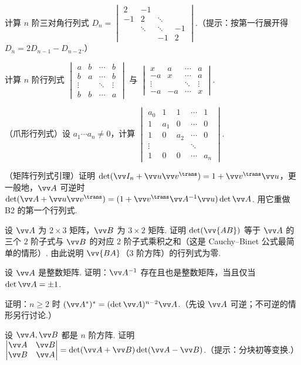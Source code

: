{		\Bgroup
		\begin{exB}
			\item\label{ex:det:B1} 计算 $n$ 阶三对角行列式 $D_n=\begin{vmatrix}2&-1&&\\-1&2&\ddots&\\&\ddots&\ddots&-1\\&&-1&2\end{vmatrix}$.（提示：按第一行展开得 $D_n=2D_{n-1}-D_{n-2}$.）
			\item\label{ex:det:B2} 计算 $n$ 阶行列式 $\begin{vmatrix}a&b&\cdots&b\\b&a&\cdots&b\\ \vdots&&\ddots&\vdots\\b&b&\cdots&a\end{vmatrix}$ 与 $\begin{vmatrix}x&a&\cdots&a\\-a&x&\cdots&a\\ \vdots&&\ddots&\vdots\\-a&-a&\cdots&x\end{vmatrix}$.
			\item\label{ex:det:B3} （爪形行列式）设 $a_1\cdots a_n\ne0$，计算 $\begin{vmatrix}a_0&1&1&\cdots&1\\1&a_1&0&\cdots&0\\1&0&a_2&\cdots&0\\ \vdots&&&\ddots&\\1&0&0&\cdots&a_n\end{vmatrix}$.
			\item\label{ex:det:B4} （矩阵行列式引理）证明 $\det(\vv I_n+\vv u\vv v^\trans)=1+\vv v^\trans\vv u$，更一般地，$\vv A$ 可逆时 $\det(\vv A+\vv u\vv v^\trans)=(1+\vv v^\trans\vv A^{-1}\vv u)\det\vv A$. 用它重做 B2 的第一个行列式.
			\item\label{ex:det:B5} 设 $\vv A$ 为 $2\times3$ 矩阵，$\vv B$ 为 $3\times2$ 矩阵. 证明 $\det(\vv{AB})$ 等于 $\vv A$ 的三个 $2$ 阶子式与 $\vv B$ 的对应 $2$ 阶子式乘积之和（这是 Cauchy–Binet 公式最简单的情形）. 由此说明 $\vv{BA}$（$3$ 阶方阵）的行列式为零.
			\item\label{ex:det:B6} 设 $\vv A$ 是整数矩阵. 证明：$\vv A^{-1}$ 存在且也是整数矩阵，当且仅当 $\det\vv A=\pm1$.
			\item\label{ex:det:B7} 证明：$n\ge2$ 时 $(\vv A^*)^*=(\det\vv A)^{n-2}\vv A$.（先设 $\vv A$ 可逆；不可逆的情形另行讨论.）
			\item\label{ex:det:B8} 设 $\vv A,\vv B$ 都是 $n$ 阶方阵. 证明 $\begin{vmatrix}\vv A&\vv B\\ \vv B&\vv A\end{vmatrix}=\det(\vv A+\vv B)\det(\vv A-\vv B)$.（提示：分块初等变换.）

\end{exB}}

